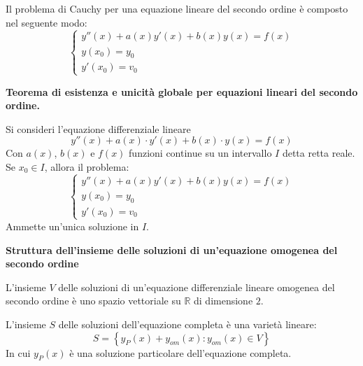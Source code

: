 \documentclass[a4paper]{article}
\newcommand{\definition}[1]{\textcolor{Red3}{\textbf{#1}}}
\begin{document}
	\noindent
	Il problema di Cauchy per una equazione lineare del secondo ordine è composto nel seguente modo:
	\begin{equation*}
		\begin{cases}
			y''\left(x\right) + a\left(x\right)y'\left(x\right) + b\left(x\right)y\left(x\right) = f\left(x\right) \\
			y\left(x_{0}\right) = y_{0} \\
			y'\left(x_{0}\right) = v_{0}
		\end{cases}
	\end{equation*}
	
	\begin{boxdef}
		\definition{Teorema di esistenza e unicità globale per equazioni lineari del secondo ordine.}\newline
		
		Si consideri l'equazione differenziale lineare
		\begin{equation*}
			y''\left(x\right) + a\left(x\right) \cdot y'\left(x\right) + b\left(x\right) \cdot y\left(x\right) = f\left(x\right)
		\end{equation*}
		Con $a\left(x\right)$, $b\left(x\right)$ e $f\left(x\right)$ funzioni continue su un intervallo $I$ detta retta reale. Se $x_{0} \in I$, allora il problema:
		\begin{equation*}
			\begin{cases}
				y''\left(x\right) + a\left(x\right)y'\left(x\right) + b\left(x\right)y\left(x\right) = f\left(x\right) \\
				y\left(x_{0}\right) = y_{0} \\
				y'\left(x_{0}\right) = v_{0}
			\end{cases}
		\end{equation*}
		Ammette un'unica soluzione in $I$.
	\end{boxdef}

	\begin{boxdef}
		\definition{Struttura dell'insieme delle soluzioni di un'equazione omogenea del secondo ordine}\newline

		L'insieme $V$ delle soluzioni di un'equazione differenziale lineare omogenea del secondo ordine è uno spazio vettoriale su $\mathbb{R}$ di dimensione $2$.
	\end{boxdef}

	\noindent
	L'insieme $S$ delle soluzioni dell'equazione completa è una varietà lineare:
	\begin{equation*}
		S = \left\{y_{P}\left(x\right) + y_{om}\left(x\right) : y_{om}\left(x\right) \in V\right\}
	\end{equation*}
	In cui $y_{P}\left(x\right)$ è una soluzione particolare dell'equazione completa.\newline
\end{document}
